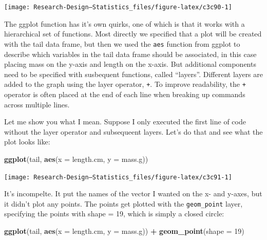 \documentclass[
]{book}
\newenvironment{Shaded}{\begin{snugshade}}{\end{snugshade}}
\newcommand{\AttributeTok}[1]{\textcolor[rgb]{0.13,0.29,0.53}{#1}}
\newcommand{\DecValTok}[1]{\textcolor[rgb]{0.00,0.00,0.81}{#1}}
\newcommand{\FunctionTok}[1]{\textcolor[rgb]{0.13,0.29,0.53}{\textbf{#1}}}
\newcommand{\NormalTok}[1]{#1}
\newcommand{\SpecialCharTok}[1]{\textcolor[rgb]{0.81,0.36,0.00}{\textbf{#1}}}
\begin{document}
\begin{center}\texttt{[image: Research-Design---Statistics\_files/figure-latex/c3c90-1]} \end{center}

The ggplot function has it's own quirks, one of which is that it works with a hierarchical set of functions. Most directly we specified that a plot will be created with the tail data frame, but then we used the \texttt{aes} function from ggplot to describe which variables in the tail data frame should be associated, in this case placing mass on the y-axis and length on the x-axis. But additional components need to be specified with susbequent functions, called ``layers''. Different layers are added to the graph using the layer operator, \texttt{+}. To improve readability, the \texttt{+} operator is often placed at the end of each line when breaking up commands across multiple lines.

Let me show you what I mean. Suppose I only executed the first line of code without the layer operator and subsequeent layers. Let's do that and see what the plot looks like:

\begin{Shaded}
\begin{Highlighting}[]
\FunctionTok{ggplot}\NormalTok{(tail, }\FunctionTok{aes}\NormalTok{(}\AttributeTok{x =}\NormalTok{ length.cm, }\AttributeTok{y =}\NormalTok{ mass.g))}
\end{Highlighting}
\end{Shaded}

\begin{center}\texttt{[image: Research-Design---Statistics\_files/figure-latex/c3c91-1]} \end{center}

It's incompelte. It put the names of the vector I wanted on the x- and y-axes, but it didn't plot any points. The points get plotted with the \texttt{geom\_point} layer, specifying the points with shape = 19, which is simply a closed circle:

\begin{Shaded}
\begin{Highlighting}[]
\FunctionTok{ggplot}\NormalTok{(tail, }\FunctionTok{aes}\NormalTok{(}\AttributeTok{x =}\NormalTok{ length.cm, }\AttributeTok{y =}\NormalTok{ mass.g)) }\SpecialCharTok{+}
  \FunctionTok{geom\_point}\NormalTok{(}\AttributeTok{shape =} \DecValTok{19}\NormalTok{) }
\end{Highlighting}
\end{Shaded}
\end{document}
